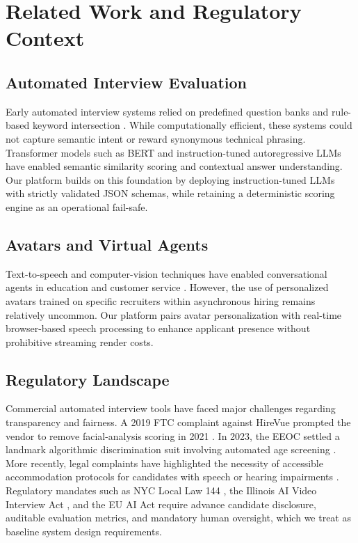 \documentclass[conference]{IEEEtran}
\begin{document}
\section{Related Work and Regulatory Context}

\subsection{Automated Interview Evaluation}

Early automated interview systems relied on predefined question banks and rule-based keyword intersection \cite{salgado}. While computationally efficient, these systems could not capture semantic intent or reward synonymous technical phrasing. Transformer models such as BERT \cite{devlin} and instruction-tuned autoregressive LLMs \cite{brown} have enabled semantic similarity scoring and contextual answer understanding. Our platform builds on this foundation by deploying instruction-tuned LLMs with strictly validated JSON schemas, while retaining a deterministic scoring engine as an operational fail-safe.

\subsection{Avatars and Virtual Agents}

Text-to-speech and computer-vision techniques have enabled conversational agents in education and customer service \cite{sridhar,cassell}. However, the use of personalized avatars trained on specific recruiters within asynchronous hiring remains relatively uncommon. Our platform pairs avatar personalization with real-time browser-based speech processing to enhance applicant presence without prohibitive streaming render costs.

\subsection{Regulatory Landscape}

Commercial automated interview tools have faced major challenges regarding transparency and fairness. A 2019 FTC complaint against HireVue prompted the vendor to remove facial-analysis scoring in 2021 \cite{hirevue}. In 2023, the EEOC settled a landmark algorithmic discrimination suit involving automated age screening \cite{eeoc}. More recently, legal complaints have highlighted the necessity of accessible accommodation protocols for candidates with speech or hearing impairments \cite{aclu}. Regulatory mandates such as NYC Local Law 144 \cite{nyclaw}, the Illinois AI Video Interview Act \cite{illinois}, and the EU AI Act \cite{euaiact} require advance candidate disclosure, auditable evaluation metrics, and mandatory human oversight, which we treat as baseline system design requirements.
\end{document}
